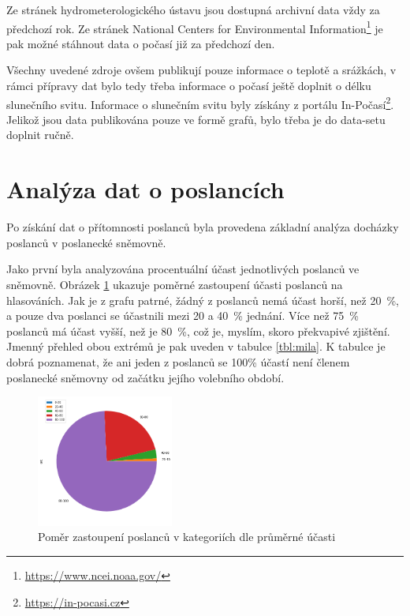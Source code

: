 \documentclass[12pt]{report}
\begin{document}
Ze stránek hydrometerologického ústavu jsou dostupná archivní data vždy za předchozí rok. Ze stránek National Centers for Environmental Information\footnote{\url{https://www.ncei.noaa.gov/}} je pak možné stáhnout data o počasí již za předchozí den. 

Všechny uvedené zdroje ovšem publikují pouze informace o teplotě a srážkách, v rámci přípravy dat bylo tedy třeba informace o počasí ještě doplnit o délku slunečního svitu. Informace o slunečním svitu byly získány z portálu In-Počasí\footnote{\url{https://in-pocasi.cz}}. Jelikož jsou data publikována pouze ve formě grafů, bylo třeba je do data-setu doplnit ručně.

\section{Analýza dat o poslancích}

Po získání dat o přítomnosti poslanců byla provedena základní analýza docházky poslanců v poslanecké sněmovně. 

Jako první byla analyzována procentuální účast jednotlivých poslanců ve sněmovně. Obrázek \ref{fig:pie} ukazuje poměrné zastoupení účasti poslanců na hlasováních. Jak je z grafu patrné, žádný z poslanců nemá účast horší, než 20~\%, a pouze dva poslanci se účastnili mezi 20 a 40~\% jednání. Více než 75~\% poslanců má účast vyšší, než je 80~\%, což je, myslím, skoro překvapivé zjištění. Jmenný přehled obou extrémů je pak uveden v tabulce \ref{tbl:mila}. K tabulce je dobrá poznamenat, že ani jeden z poslanců se 100\% účastí není členem poslanecké sněmovny od začátku jejího volebního období.

\begin{figure}
    \centering
    \includegraphics[width=0.4\textwidth]{pie.png}
    \caption{Poměr zastoupení poslanců v kategoriích dle průměrné účasti}
    \label{fig:pie}
\end{figure}
\end{document}

